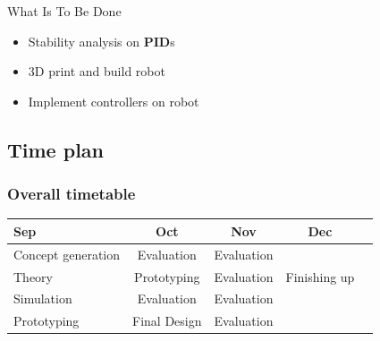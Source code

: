 \documentclass{beamer}
\begin{document}
\begin{frame}{What Is To Be Done}
    \begin{itemize}
        \item Stability analysis on \textbf{PID}s
        \item 3D print and build robot
        \item Implement controllers on robot
    \end{itemize}
\end{frame}
























\begin{frame}
    \subsection{Time plan}
    \frametitle{Overall timetable}
    \begin{table}
        \begin{tabular}{| l | c | c | c | c }
            
            Sep & Oct & Nov & Dec \\
            \hline \hline
            Concept generation & Evaluation & Evaluation &  \\ 
            \hline
            Theory & Prototyping & Evaluation & Finishing up \\
            \hline
            Simulation & Evaluation & Evaluation & \\
            \hline
            Prototyping & Final Design & Evaluation &  \\
            \hline
 
        \end{tabular}
    \end{table}    
\end{frame}
\end{document}
